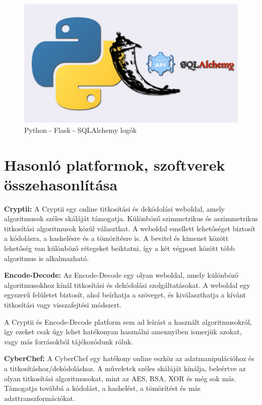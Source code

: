 \pagebreak
\begin{figure}[!h]
	\centering
	\includegraphics[scale=0.15]{images/logoPythonFlaskSqlalchemy}
	\caption{Python - Flask - SQLAlchemy logók}
\end{figure}


\section {Hasonló platformok, szoftverek összehasonlítása}

\textbf{Cryptii:} A Cryptii egy online titkosítási és dekódolási weboldal, amely algoritmusok széles skáláját támogatja. Különböző szimmetrikus és aszimmetrikus titkosítási algoritmusok közül választhat. A weboldal emellett lehetőséget biztosít a kódolásra, a hashelésre és a tömörítésre is. A bevitel és kimenet között lehetőség van különböző rétegeket beiktatni, így a két végpont között több algoritmus is alkalmazható.

\textbf{Encode-Decode:} Az Encode-Decode egy olyan weboldal, amely különböző algoritmusokhoz kínál titkosítási és dekódolási szolgáltatásokat. A weboldal egy egyszerű felületet biztosít, ahol beírhatja a szöveget, és kiválaszthatja a kívánt titkosítási vagy visszafejtési módszert.

A Cryptii és Encode-Decode platform sem ad leírást a használt algoritmusokról, így ezeket csak úgy lehet hatékonyan használni amennyiben ismerjük azokat, vagy más forrásokból tájékozódunk róluk.

\vspace{10pt}
\textbf{CyberChef:} A CyberChef egy hatékony online eszköz az adatmanipulációhoz és a titkosításhoz/dekódoláshoz. A műveletek széles skáláját kínálja, beleértve az olyan titkosítási algoritmusokat, mint az AES, RSA, XOR és még sok más. Támogatja továbbá a kódolást, a hashelést, a tömörítést és más adattranszformációkat.

